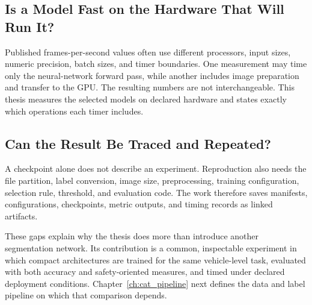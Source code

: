 \subsection{Is a Model Fast on the Hardware That Will Run It?}

Published frames-per-second values often use different processors, input
sizes, numeric precision, batch sizes, and timer boundaries. One measurement
may time only the neural-network forward pass, while another includes image
preparation and transfer to the GPU. The resulting numbers are not
interchangeable. This thesis measures the selected models on declared hardware
and states exactly which operations each timer includes.

\subsection{Can the Result Be Traced and Repeated?}

A checkpoint alone does not describe an experiment. Reproduction also needs
the file partition, label conversion, image size, preprocessing, training
configuration, selection rule, threshold, and evaluation code. The work
therefore saves manifests, configurations, checkpoints, metric outputs, and
timing records as linked artifacts.

These gaps explain why the thesis does more than introduce another
segmentation network. Its contribution is a common, inspectable experiment in
which compact architectures are trained for the same vehicle-level task,
evaluated with both accuracy and safety-oriented measures, and timed under
declared deployment conditions. Chapter~\ref{ch:cat_pipeline} next defines the
data and label pipeline on which that comparison depends.
